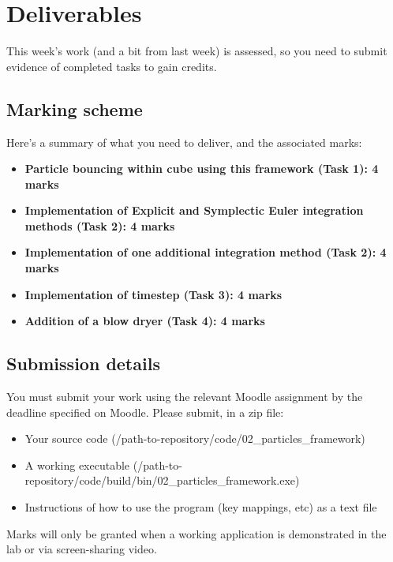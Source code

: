 \documentclass[12pt]{article}
\begin{document}
\section*{Deliverables}

This week's work (and a bit from last week) is assessed, so you need to submit evidence of completed tasks to gain credits.

\subsection*{Marking scheme}

Here's a summary of what you need to deliver, and the associated marks:

\begin{itemize}
\item \textbf{Particle bouncing within cube using this framework (Task 1): 4 marks}
\item \textbf{Implementation of Explicit and Symplectic Euler integration methods (Task 2): 4 marks} 
\item \textbf{Implementation of one additional integration method (Task 2): 4 marks}
\item \textbf{Implementation of timestep (Task 3): 4 marks}
\item \textbf{Addition of a blow dryer (Task 4): 4 marks} 
\end{itemize}

\subsection*{Submission details}

You must submit your work using the relevant Moodle assignment by the deadline specified on Moodle. Please submit, in a zip file:

\begin{itemize}
\item Your source code (/path-to-repository/code/02\_particles\_framework)
\item A working executable (/path-to-repository/code/build/bin/02\_particles\_framework.exe)
\item Instructions of how to use the program (key mappings, etc) as a text file
\end{itemize}

Marks will only be granted when a working application is demonstrated in the lab or via screen-sharing video.
\end{document}
